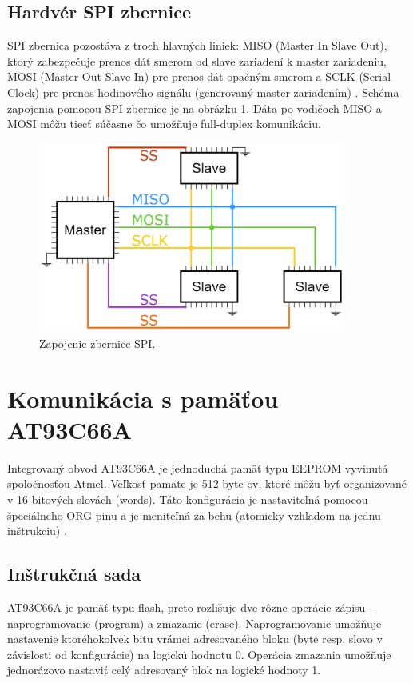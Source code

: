 \subsection{Hardvér SPI zbernice}
SPI zbernica pozostáva z troch hlavných liniek: MISO (Master In Slave Out), ktorý zabezpečuje prenos dát smerom od slave zariadení k master zariadeniu, MOSI (Master Out Slave In) pre prenos dát opačným smerom a SCLK (Serial Clock) pre prenos hodinového signálu (generovaný master zariadením) \cite{spiBus}. Schéma zapojenia pomocou SPI zbernice je na obrázku \ref{obr:spiWiring}. Dáta po vodičoch MISO a MOSI môžu tiecť súčasne čo umožňuje full-duplex komunikáciu.

\begin{figure}
    \centerline{\includegraphics[width=0.9\textwidth]{images/spiWiring.png}}
    \caption[Zapojenie zbernice SPI]{Zapojenie zbernice SPI.}
    \label{obr:spiWiring}
\end{figure}

\section{Komunikácia s pamäťou AT93C66A}
Integrovaný obvod AT93C66A je jednoduchá pamäť typu EEPROM vyvinutá spoločnosťou Atmel. Veľkosť pamäte je 512 byte-ov, ktoré môžu byť organizované v 16-bitových slovách (words). Táto konfigurácia je nastaviteľná pomocou špeciálneho ORG pinu a je meniteľná za behu (atomicky vzhľadom na jednu inštrukciu) \cite{eepromDatasheet}.

\subsection{Inštrukčná sada}
AT93C66A je pamäť typu flash, preto rozlišuje dve rôzne operácie zápisu -- naprogramovanie (program) a zmazanie (erase). Naprogramovanie umožňuje nastavenie ktoréhokoľvek bitu vrámci adresovaného bloku (byte resp. slovo v závislosti od konfigurácie) na logickú hodnotu 0. Operácia zmazania umožňuje jednorázovo nastaviť celý adresovaný blok na logické hodnoty 1. 

